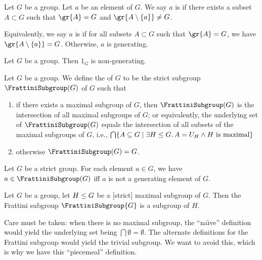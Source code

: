\begin{definition}
Let $G$ be a group. Let $a$ be an element of $G$.
We say $a$ is  if there exists a subset $A\subset G$
such that $\gr{A}=G$ and $\gr{A\setminus\{a\}}\neq G$.

Equivalently, we say $a$ is  if for all subsets
$A\subset G$ such that $\gr{A}=G$, we have
$\gr{A\setminus\{a\}}=G$. Otherwise, $a$ is generating.
\end{definition}

\begin{theorem}
Let $G$ be a group. Then $1_{G}$ is non-generating.
\end{theorem}

\begin{definition}
Let $G$ be a group. We define the  of $G$ to
be the strict subgroup $\FrattiniSubgroup(G)$ of $G$ such that
\begin{enumerate}
\item if there exists a maximal subgroup of $G$, then
  $\FrattiniSubgroup(G)$ is the intersection of all maximal subgroups
  of $G$; or equivalently, the underlying set of $\FrattiniSubgroup(G)$ equals the intersection of
all subsets of the maximal subgroups of $G$, i.e., $\bigcap\{A\subset G\mid\exists H\subgroup G\ldotp A=U_{H}\land H\mbox{ is maximal}\}$
\item otherwise $\FrattiniSubgroup(G)=G$.
\end{enumerate}
\end{definition}

\begin{theorem}
Let $G$ be a strict group. For each element $a\in G$,
we have $a\in\FrattiniSubgroup(G)$ iff $a$ is not a generating element
of $G$.
\end{theorem}

\begin{theorem}
Let $G$ be a group, let $H\leq G$ be a [strict] maximal subgroup
of $G$. Then the Frattini subgroup $\FrattiniSubgroup{G}$ is a subgroup of $H$.
\end{theorem}

\begin{remark}
Care must be taken: when there is no maximal subgroup, the
``na\"{\i}ve'' definition would yield the underlying set being
$\bigcap\emptyset=\emptyset$. The alternate definitions for the
Frattini subgroup would yield the trivial subgroup. We want to avoid
this, which is why we have this ``piecemeal'' definition.
\end{remark}


